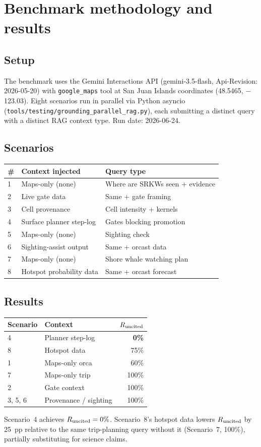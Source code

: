 \section{Benchmark methodology and results}

\subsection{Setup}

The benchmark uses the Gemini Interactions API (gemini-3.5-flash, Api-Revision: 2026-05-20) with
\texttt{google\_maps} tool at San Juan Islands coordinates (48.5465, $-$123.03). Eight scenarios run
in parallel via Python asyncio (\texttt{tools/testing/grounding\_parallel\_rag.py}), each submitting a
distinct query with a distinct RAG context type. Run date: 2026-06-24.

\subsection{Scenarios}

\begin{center}
\small
\begin{tabular}{@{}lll@{}}
\toprule
\# & Context injected & Query type \\
\midrule
1 & Maps-only (none) & Where are SRKWs seen + evidence \\
2 & Live gate data & Same + gate framing \\
3 & Cell provenance & Cell intensity + kernels \\
4 & Surface planner step-log & Gates blocking promotion \\
5 & Maps-only (none) & Sighting check \\
6 & Sighting-assist output & Same + orcast data \\
7 & Maps-only (none) & Shore whale watching plan \\
8 & Hotspot probability data & Same + orcast forecast \\
\bottomrule
\end{tabular}
\end{center}

\subsection{Results}

\begin{center}
\small
\begin{tabular}{@{}llr@{}}
\toprule
Scenario & Context & $R_{\mathrm{uncited}}$ \\
\midrule
4 & Planner step-log & \textbf{0\%} \\
8 & Hotspot data & 75\% \\
1 & Maps-only orca & 60\% \\
7 & Maps-only trip & 100\% \\
2 & Gate context & 100\% \\
3, 5, 6 & Provenance / sighting & 100\% \\
\bottomrule
\end{tabular}
\end{center}

Scenario~4 achieves $R_{\mathrm{uncited}} = 0\%$. Scenario~8's hotspot data lowers $R_{\mathrm{uncited}}$ by 25~pp
relative to the same trip-planning query without it (Scenario~7, 100\%), partially substituting
for science claims.